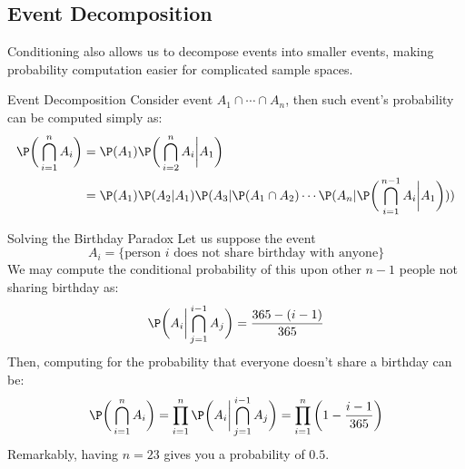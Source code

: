 \subsection{Event Decomposition}
Conditioning also allows us to decompose events into smaller events, making probability computation easier for complicated sample spaces.
\begin{ln-explain}{Event Decomposition}{}
    Consider event $A_1 \cap \cdots \cap A_n$, then such event's probability can be computed simply as:
    \begin{align*}
        \P\bigg(\bigcap_{i = 1}^n A_i\bigg)
        &= \P(A_1) \P\bigg(\bigcap_{i = 2}^n A_i \bigg| A_1\bigg) \\
        &= \P(A_1) \P(A_2 | A_1) \P(A_3 | \P(A_1 \cap A_2) \cdots \P(A_n | \P\bigg(\bigcap_{i = 1}^{n - 1} A_i \bigg| A_1\bigg)))
    \end{align*}
\end{ln-explain}
\begin{ln-practice}{Solving the Birthday Paradox}{}
    Let us suppose the event
    \[A_i = \{\text{person $i$ does not share birthday with anyone}\}\]
    We may compute the conditional probability of this upon other $n - 1$ people not sharing birthday as:
    \[\P \bigg(A_i \bigg| \bigcap_{j=1}^{i - 1} A_j \bigg) = \frac{365 - (i - 1)}{365}\]
    Then, computing for the probability that everyone doesn't share a birthday can be:
    \[
        \P \bigg( \bigcap_{i = 1}^n A_i \bigg) = \prod_{i = 1}^n \P \bigg( A_i \bigg| \bigcap_{j = 1}^{i - 1} A_j \bigg) = \prod_{i = 1}^n \bigg(1 - \frac{i - 1}{365} \bigg)
    \]
    Remarkably, having $n = 23$ gives you a probability of $0.5$.
\end{ln-practice}

